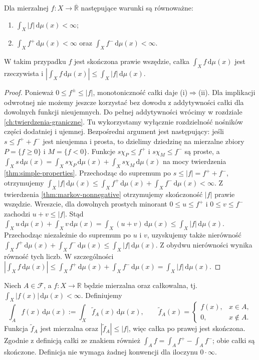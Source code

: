 \begin{twierdzenie}
\label{thm:integrability-criterion}
Dla mierzalnej $f:X\to\overline{\mathbb R}$ następujące
warunki są równoważne:
\begin{enumerate}[label=\textup{(\roman*)}]
\item $\int_X|f|\,\mathrm d\mu(x)<\infty$;
\item $\int_Xf^+\,\mathrm d\mu(x)<\infty$ oraz
$\int_Xf^-\,\mathrm d\mu(x)<\infty$.
\end{enumerate}
W takim przypadku $f$ jest skończona prawie wszędzie,
całka $\int_Xf\,\mathrm d\mu(x)$ jest rzeczywista i
$|\int_Xf\,\mathrm d\mu(x)|\le\int_X|f|\,\mathrm d\mu(x)$.
\end{twierdzenie}
\begin{proof}
Ponieważ $0\le f^\pm\le|f|$, monotoniczność całki
daje (i)$\Rightarrow$(ii). Dla implikacji odwrotnej
nie możemy jeszcze korzystać bez dowodu z addytywności
całki dla dowolnych funkcji nieujemnych. Do pełnej addytywności wrócimy w rozdziale
\ref{ch:twierdzenia-graniczne}. Tu wykorzystamy
wyłącznie rozdzielność nośników części dodatniej i ujemnej.
Bezpośredni argument jest następujący: jeśli
$s\le f^++f^-$ jest nieujemna i prosta, to
dzielimy dziedzinę na mierzalne zbiory
$P=\{f\ge0\}$ i $M=\{f<0\}$. Funkcje
$s\chi_P\le f^+$ i $s\chi_M\le f^-$
są proste, a
$\int_Xs\,\mathrm d\mu(x)=
\int_Xs\chi_P\,\mathrm d\mu(x)+
\int_Xs\chi_M\,\mathrm d\mu(x)$
na mocy twierdzenia \ref{thm:simple-properties}.
Przechodząc do supremum po $s\le|f|=f^++f^-$,
otrzymujemy
$\int_X|f|\,\mathrm d\mu(x)\le
\int_Xf^+\,\mathrm d\mu(x)+
\int_Xf^-\,\mathrm d\mu(x)<\infty$.
Z twierdzenia \ref{thm:markov-nonnegative} otrzymujemy
skończoność $|f|$ prawie wszędzie. Wreszcie, dla dowolnych prostych minorant
$0\le u\le f^+$ i $0\le v\le f^-$ zachodzi
$u+v\le|f|$. Stąd
$\int_Xu\,\mathrm d\mu(x)+\int_Xv\,\mathrm d\mu(x)
=\int_X(u+v)\,\mathrm d\mu(x)
\le\int_X|f|\,\mathrm d\mu(x)$.
Przechodząc niezależnie do supremum po $u$ i $v$,
uzyskujemy także nierówność
$\int_Xf^+\,\mathrm d\mu(x)+\int_Xf^-\,\mathrm d\mu(x)
\le\int_X|f|\,\mathrm d\mu(x)$.
Z obydwu nierówności wynika równość tych liczb.
W szczególności $|\int_Xf\,\mathrm d\mu(x)|
\le\int_Xf^+\,\mathrm d\mu(x)+
\int_Xf^-\,\mathrm d\mu(x)=\int_X|f|\,\mathrm d\mu(x)$.
\end{proof}

\begin{definicja}
\label{def:signed-integral-over-set-7}
Niech $A\in\mathcal F$, a $f:X\to\mathbb R$ będzie
mierzalna oraz całkowalna, tj.
$\int_X|f(x)|\,\mathrm d\mu(x)<\infty$.
Definiujemy
\[
\int_A f(x)\,\mathrm d\mu(x)
:=\int_X\widetilde f_A(x)\,\mathrm d\mu(x),
\qquad
\widetilde f_A(x)=
\begin{cases}f(x),&x\in A,\\0,&x\notin A.\end{cases}
\]
Funkcja $\widetilde f_A$ jest mierzalna oraz
$|\widetilde f_A|\le|f|$, więc całka po prawej
jest skończona. Zgodnie z definicją całki ze znakiem
również
$\int_A f=\int_A f^+-\int_A f^-$;
obie całki są skończone. Definicja nie wymaga
żadnej konwencji dla iloczynu $0\cdot\infty$.
\end{definicja}

